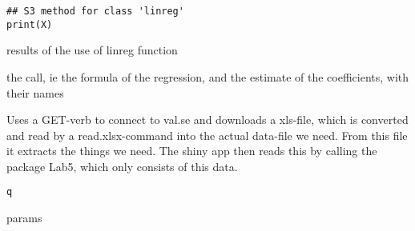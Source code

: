 \documentclass[a4paper]{book}
\begin{document}
%
\begin{Usage}
\begin{verbatim}
## S3 method for class 'linreg'
print(X)
\end{verbatim}
\end{Usage}
%
\begin{Arguments}
\begin{ldescription}
\item[\code{what}] results of the use of linreg function
\end{ldescription}
\end{Arguments}
%
\begin{Value}
the call, ie the formula of the regression, and the estimate of the coefficients,
with their names
\end{Value}
%
\begin{Description}\relax
Uses a GET-verb to connect to val.se and downloads a xls-file, which is
converted and read by a read.xlsx-command into the actual data-file we need. From this
file it extracts the things we need. The shiny app then reads this by calling the
package Lab5, which only consists of this data.
\end{Description}
%
\begin{Usage}
\begin{verbatim}
q
\end{verbatim}
\end{Usage}
%
\begin{Arguments}
\begin{ldescription}
\item[\code{No}] params
\end{ldescription}
\end{Arguments}
%
\end{document}
